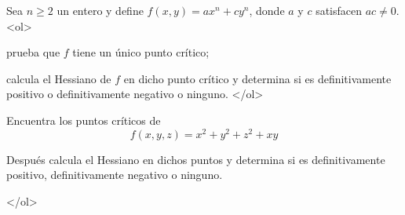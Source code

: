 \documentclass{article}
\theoremstyle{definition}
\begin{document}
  \item Sea $n\geq 2$ un entero y define $f(x,y)=ax^n+cy^n$, donde
    $a$ y $c$ satisfacen $ac\ne 0$.
    <ol>
    \item prueba que $f$ tiene un único punto crítico;
    \item calcula el Hessiano de $f$ en dicho punto crítico
      y determina si es definitivamente positivo o definitivamente
      negativo o ninguno.
    </ol>

  \item Encuentra los puntos críticos de
    $$
    f(x,y,z)=x^2+y^2+z^2+xy
    $$

    Después calcula el Hessiano en dichos puntos y determina si es
    definitivamente positivo, definitivamente negativo o ninguno.

 
  </ol>
  

  
\end{document}
